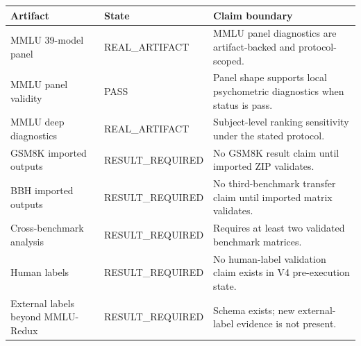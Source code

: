 \begin{tabular}{lll}
\toprule
Artifact & State & Claim boundary \\
\midrule
MMLU 39-model panel & REAL\_ARTIFACT & MMLU panel diagnostics are artifact-backed and protocol-scoped. \\
MMLU panel validity & PASS & Panel shape supports local psychometric diagnostics when status is pass. \\
MMLU deep diagnostics & REAL\_ARTIFACT & Subject-level ranking sensitivity under the stated protocol. \\
GSM8K imported outputs & RESULT\_REQUIRED & No GSM8K result claim until imported ZIP validates. \\
BBH imported outputs & RESULT\_REQUIRED & No third-benchmark transfer claim until imported matrix validates. \\
Cross-benchmark analysis & RESULT\_REQUIRED & Requires at least two validated benchmark matrices. \\
Human labels & RESULT\_REQUIRED & No human-label validation claim exists in V4 pre-execution state. \\
External labels beyond MMLU-Redux & RESULT\_REQUIRED & Schema exists; new external-label evidence is not present. \\
\bottomrule
\end{tabular}

